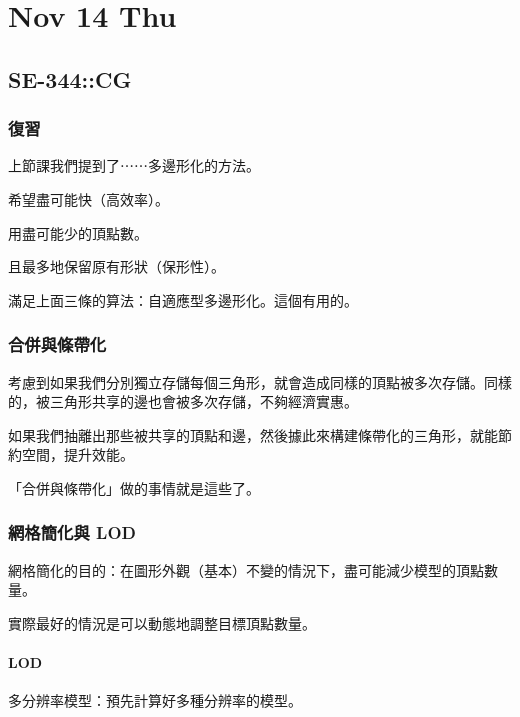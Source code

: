 \documentclass[
]{article}
\date{}
\begin{document}
\hypertarget{header-n0}{%
\section{Nov 14 Thu}\label{header-n0}}

\hypertarget{header-n2}{%
\subsection{SE-344::CG}\label{header-n2}}

\hypertarget{header-n3}{%
\subsubsection{復習}\label{header-n3}}

上節課我們提到了⋯⋯多邊形化的方法。

希望盡可能快（高效率）。

用盡可能少的頂點數。

且最多地保留原有形狀（保形性）。

滿足上面三條的算法：自適應型多邊形化。這個有用的。

\hypertarget{header-n9}{%
\subsubsection{合併與條帶化}\label{header-n9}}

考慮到如果我們分別獨立存儲每個三角形，就會造成同樣的頂點被多次存儲。同樣的，被三角形共享的邊也會被多次存儲，不夠經濟實惠。

如果我們抽離出那些被共享的頂點和邊，然後據此來構建條帶化的三角形，就能節約空間，提升效能。

「合併與條帶化」做的事情就是這些了。

\hypertarget{header-n13}{%
\subsubsection{網格簡化與 LOD}\label{header-n13}}

網格簡化的目的：在圖形外觀（基本）不變的情況下，盡可能減少模型的頂點數量。

實際最好的情況是可以動態地調整目標頂點數量。

\hypertarget{header-n16}{%
\paragraph{LOD}\label{header-n16}}

多分辨率模型：預先計算好多種分辨率的模型。
\end{document}
